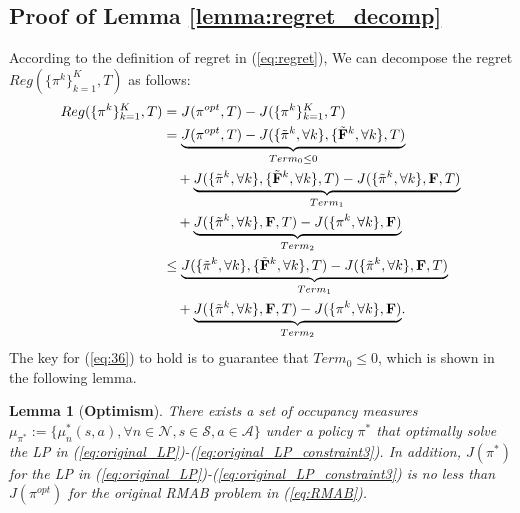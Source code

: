 \documentclass{article} %
\def\eqref#1{equation~\ref{#1}}
\newcommand{\bF}{\mathbf{F}}
\newcommand{\cA}{\mathcal{A}}
\newcommand{\cS}{\mathcal{S}}
\newcommand{\cN}{\mathcal{N}}
\newtheorem{lemma}{Lemma}
\renewcommand{\eqref}[1]{(\ref{#1})}
\begin{document}
{\subsection{Proof of Lemma \ref{lemma:regret_decomp}}

According to the definition of regret in \eqref{eq:regret}, We can decompose the regret $Reg(\{\pi^k\}_{k=1}^K, T)$ as follows:
\begin{align}\nonumber
   Reg(\{\pi^k\}_{k=1}^K, T)&=J(\pi^{opt},T)-J(\{\pi^k\}_{k=1}^K, T)\allowdisplaybreaks\\
    &=\underset{Term_0\leq 0}{\underbrace{J( \pi^{opt}, T)-J( \{\tilde{\pi}^k, \forall k\}, \{\tilde{\bF}^k, \forall  k\}, T)}}\nonumber\allowdisplaybreaks\\
    &\quad+\underset{Term_1}{\underbrace{J( \{\tilde{\pi}^k, \forall k\}, \{\tilde{\bF}^k, \forall k\}, T)-J(\{\tilde{\pi}^k, \forall k\}, \bF, T)}}\nonumber\allowdisplaybreaks\\
    &\quad+\underset{Term_2}{\underbrace{J(\{\tilde{\pi}^k, \forall k\}, \bF, T)-J(\{\pi^{k}, \forall k\}, \bF)} }\allowdisplaybreaks\nonumber\\
    &\leq\underset{Term_1}{\underbrace{J( \{\tilde{\pi}^k, \forall k\}, \{\tilde{\bF}^k, \forall k\}, T)-J(\{\tilde{\pi}^k, \forall k\}, \bF, T)}}\nonumber\allowdisplaybreaks\\
    &\quad+\underset{Term_2}{\underbrace{J(\{\tilde{\pi}^k, \forall k\}, \bF, T)-J(\{\pi^{k}, \forall k\}, \bF)} }.\label{eq:36}
\end{align}
The key for \eqref{eq:36} to hold is to guarantee that $Term_0\leq 0$, which is shown in the following lemma.

\begin{lemma}[\textbf{Optimism}]\label{lemma:upperbound}
There exists a set of occupancy measures $\mu_{\pi^*}:=\{\mu^*_n(s,a), \forall n\in\cN, s\in\cS, a\in\cA\}$ under a policy $\pi^*$  that optimally solve the LP in \eqref{eq:original_LP}-\eqref{eq:original_LP_constraint3}. In addition, $J(\pi^*)$ for the LP in \eqref{eq:original_LP}-\eqref{eq:original_LP_constraint3} is no less than $J(\pi^{opt})$ for the original RMAB problem in \eqref{eq:RMAB}. 
\end{lemma}

}
\end{document}
